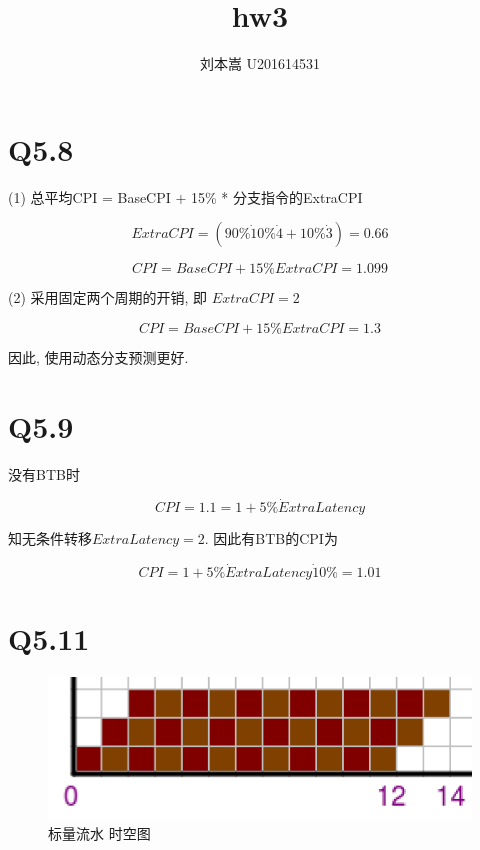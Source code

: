 \documentclass{article}
\begin{document}
\begin{CJK}{UTF8}{gbsn}

\title{hw3}
\author{刘本嵩 U201614531}

\maketitle


\section{Q5.8}
\Large
\smallskip

(1) 总平均CPI = BaseCPI + 15\% * 分支指令的ExtraCPI

$$ExtraCPI = (90\% \dot 10\% \dot 4 + 10\% \dot 3) = 0.66$$

$$CPI = BaseCPI + 15\% ExtraCPI = 1.099$$

(2) 采用固定两个周期的开销, 即 $ExtraCPI = 2$

$$CPI = BaseCPI + 15\% ExtraCPI = 1.3$$

因此, 使用动态分支预测更好.

\section{Q5.9}
\Large
\smallskip

没有BTB时

$$CPI = 1.1 = 1 + 5\% \dot ExtraLatency$$

知无条件转移$ExtraLatency=2$. 因此有BTB的CPI为

$$CPI = 1 + 5\% \dot ExtraLatency \dot 10\% = 1.01$$

\section{Q5.11}
\Large
\smallskip

\begin{figure}[H]
\centering
\includegraphics[scale=0.3]{hw3-img1.png}
\caption{标量流水 时空图}
\end{figure}


\end{CJK}
\end{document}
